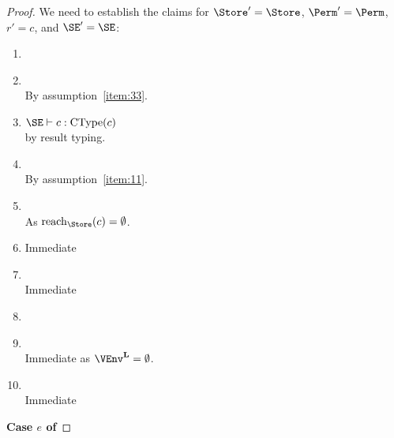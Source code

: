 \begin{proof}
  We need to establish the claims for $\Store' = \Store$,
  $\Perm'=\Perm$, $r' = c$, and $\SE' = \SE$:
  \begin{enumerate}[({R}1)]
  \item \resultOk{}{}
  \item \resultEnv{}{} \\
    By assumption~\ref{item:33}.
  \item $\SE \vdash c : \CType c$
    \\by result typing.
  \item \resultPermDom{}{}
    \\ By assumption~\ref{item:11}.
  \item \resultReachPerm{}{}
    \\ As $\Reach\Store c = \emptyset$.
  \item \resultFrame{}{}{}
    Immediate
  \item \resultImmutables{}{}{}
    \\ Immediate
  \item \resultMutables{}{}{}
  \item \resultResources{}{}{}
    \\ Immediate as $\Active\VEnv = \emptyset$.
  \item \resultThinAir{}{}
    \\ Immediate
  \end{enumerate}

  \newpage
  \textbf{Case $e$ of}


\end{proof}
